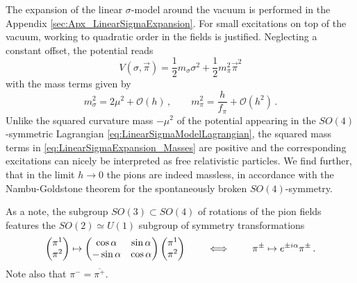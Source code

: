 The expansion of the linear $\sigma$-model around the vacuum is performed in the Appendix \ref{sec:Apx_LinearSigmaExpansion}. For small excitations on top of the vacuum, working to quadratic order in the fields is justified. Neglecting a constant offset, the potential reads
\begin{equation}
    V(\sigma,\vec{\pi})=\frac{1}{2}m_\sigma\sigma^2+\frac{1}{2}m_\pi^2\vec{\pi}^2
\end{equation}
with the mass terms given by
\begin{equation}
    m_\sigma^2=2\mu^2+\mathcal{O}(h)\,,\qquad m_\pi^2=\frac{h}{f_\pi}+\mathcal{O}(h^2)\,.
    \label{eq:LinearSigmaExpansion_Masses}
\end{equation}
Unlike the squared curvature mass ${-\mu^2}$ of the potential appearing in the $SO(4)$-symmetric Lagrangian \ref{eq:LinearSigmaModelLagrangian}, the squared mass terms in \eqref{eq:LinearSigmaExpansion_Masses} are positive and the corresponding excitations can nicely be interpreted as free relativistic particles. We find further, that in the limit $h\to 0$ the pions are indeed massless, in accordance with the Nambu-Goldstone theorem for the spontaneously broken $SO(4)$-symmetry. 

As a note, the subgroup ${SO(3)\subset SO(4)}$ of rotations of the pion fields features the ${SO(2)\simeq U(1)}$ subgroup of symmetry transformations
\begin{equation}
    \begin{pmatrix}
        \pi^1\\\pi^2
    \end{pmatrix}
        \mapsto
        \begin{pmatrix}
            \cos\alpha&\sin\alpha\\-\sin\alpha&\cos\alpha
        \end{pmatrix}
        \begin{pmatrix}
            \pi^1\\\pi^2
        \end{pmatrix}
        \qquad\iff\qquad\pi^\pm\mapsto e^{\pm{i}\alpha}\pi^\pm\,.
\end{equation}
Note also that $\pi^-=\overline{\pi^+}$.
